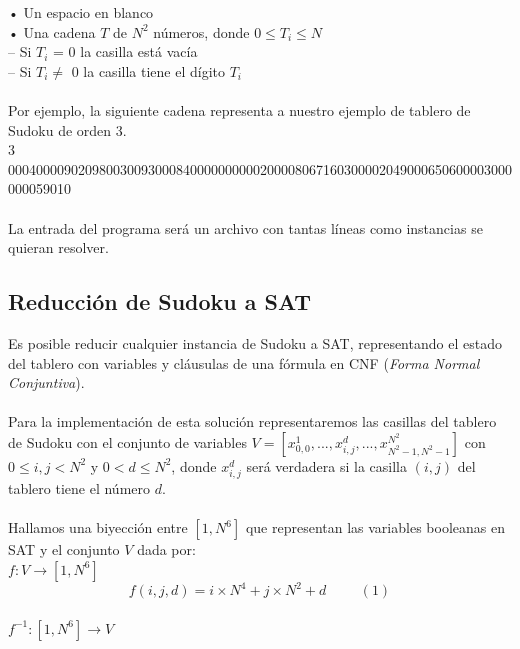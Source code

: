 \documentclass[letterpaper,12pt]{article}
\begin{document}
• Un espacio en blanco\\

• Una cadena $T$ de $N^2$ números, donde $0 \leq T_i \leq N$\\

\hspace{1cm}– Si $T_i$ = 0 la casilla está vacía\\

\hspace{1cm}– Si $T_i \neq$ 0 la casilla tiene el dígito $T_i$\\
\\
Por ejemplo, la siguiente cadena representa a nuestro ejemplo de tablero de Sudoku de orden 3.\\

\footnotesize{3 000400009020980030093000840000000000200008067160300002049000650600003000000059010}\\
\\
\normalsize
La entrada del programa será un archivo con tantas líneas como instancias se quieran resolver.

\subsection{Reducción de Sudoku a SAT}

Es posible reducir cualquier instancia de Sudoku a SAT, representando el estado del tablero con variables y cláusulas de una fórmula en CNF (\textit{Forma Normal Conjuntiva}).\\
\\
Para la implementación de esta solución representaremos las casillas del tablero de Sudoku con el conjunto de variables $V = [x^1_{0,0}, ..., x^d_{i,j}, ..., x^{N^2}_{N^2-1, N^2-1}]$ con $0 \leq i, j < N^2$ y $0 < d \leq N^2$, donde $x^d_{i,j}$ ser\'a verdadera si la casilla $(i,j)$ del tablero tiene el número $d$.\\
\\
Hallamos una biyección entre $[1, N^6]$ que representan las variables booleanas en SAT y el conjunto $V$ dada por:\\

$f: V \rightarrow [1,N^6]$
\begin{equation*}
    f(i,j,d) = i \times N^4 + j \times N^2 + d \hspace{1cm} \label{eq:1} (1)
\end{equation*}\\

$f^{-1} : [1,N^6] \rightarrow V$
\end{document}
